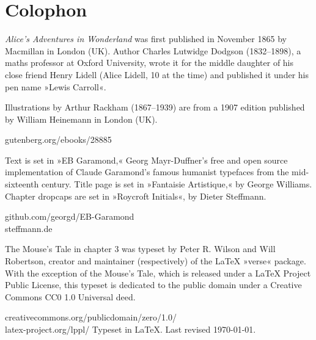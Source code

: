\documentclass[
paper=5.5in:8.5in,
]{scrbook}
\begin{document}
\chapter*{Colophon}

\centering

\vfill
\begin{minipage}{\textwidth}
\textit{Alice's Adventures in Wonderland} was first published in November 1865 by Macmillan in London (UK). Author Charles Lutwidge Dodgson (1832--1898), a maths professor at Oxford University, wrote it for the middle daughter of his close friend Henry Lidell (Alice Lidell, 10 at the time) and published it under his pen name »Lewis Carroll«.

\indent Illustrations by Arthur Rackham (1867--1939) are from a 1907 edition published by William Heinemann in London (UK).
\end{minipage}
\vfill
gutenberg.org/ebooks/28885
\vfill
\divider
\vfill
\begin{minipage}{\textwidth}
Text is set in »EB Garamond,« Georg Mayr-Duffner's free and open source implementation of Claude Garamond’s famous humanist typefaces from the mid-sixteenth century. Title page is set in »Fantaisie Artistique,« by George Williams. Chapter dropcaps are set in »Roycroft Initials«, by Dieter Steffmann.
\end{minipage}
\vfill
github.com/georgd/EB-Garamond\\steffmann.de
\vfill
\divider
\vfill
\begin{minipage}{\textwidth}
The Mouse's Tale in chapter 3 was typeset by Peter R. Wilson and Will Robertson, creator and maintainer (respectively) of the \LaTeX{} »verse« package. With the exception of the Mouse's Tale, which is released under a \LaTeX{} Project Public License, this typeset is dedicated to the public domain under a Creative Commons CC0 1.0 Universal deed. 
\end{minipage}
\vfill
creativecommons.org/publicdomain/zero/1.0/\\latex-project.org/lppl/
\vfill
\divider
\vfill
Typeset in \LaTeX{}. Last revised \today.
\thispagestyle{empty}
\end{document}
